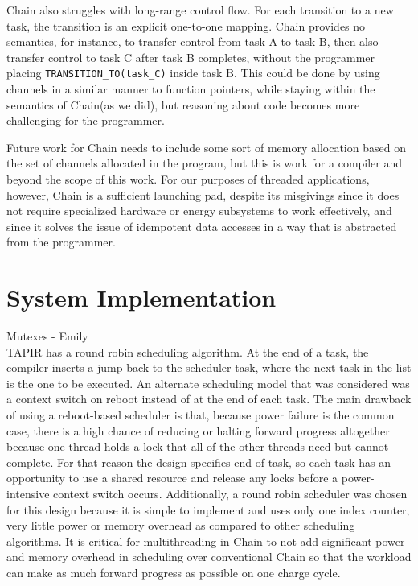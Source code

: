 \documentclass[11pt]{sensys-proc}
\newcommand{\chain}{Chain\xspace}
\begin{document}
\chain also struggles with long-range control flow. For each transition to a
new task, the transition is an explicit one-to-one mapping. \chain provides no
semantics, for instance, to transfer control from task A to task B, then also
transfer control to task C after task B completes, without the programmer
placing \texttt{TRANSITION\_TO(task\_C)} inside task B. This could be done by
using channels in a similar manner to function pointers, while staying within
the semantics of \chain (as we did), but reasoning about code becomes more
challenging for the programmer.


Future work for \chain needs to include some sort of memory allocation based on
the set of channels allocated in the program, but this is work for a compiler
and beyond the scope of this work. For our purposes of threaded applications,
however, \chain is a sufficient launching pad, despite its misgivings since it
does not require specialized hardware or energy subsystems to work effectively,
and since it solves the issue of idempotent data accesses in a way that is
abstracted from the programmer.


\section{System Implementation } %
Mutexes - Emily\\

TAPIR has a round robin scheduling algorithm. At the end of a task, the compiler
inserts a jump back to the scheduler task, where the next task in the list is
the one to be executed. An alternate scheduling model that was considered was
a context switch on reboot instead of at the end of each task. The main drawback
of using a reboot-based scheduler is that, because power failure is the common
case, there is a high chance of reducing or halting forward progress altogether
because one thread holds a lock that all of the other threads need but cannot
complete. For that reason the design specifies end of task, so each task has
an opportunity to use a shared resource and release any locks before a power-
intensive context switch occurs. Additionally, a round robin scheduler was 
chosen for this design because it is simple to implement and uses only one index counter,
very little power or memory overhead as compared to other scheduling algorithms. It is 
critical for multithreading in Chain to not add significant power and memory
overhead in scheduling over conventional Chain so that the workload can
make as much forward progress as possible on one charge cycle.
\end{document}
